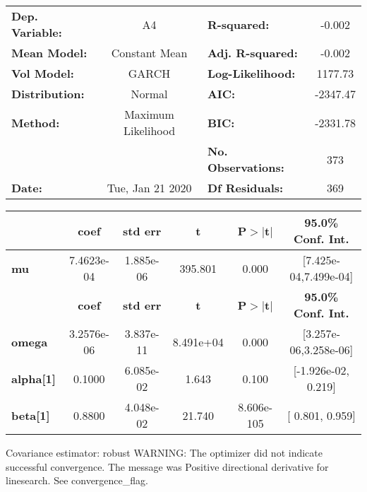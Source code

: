 \begin{center}
\begin{tabular}{lclc}
\toprule
\textbf{Dep. Variable:} &         A4         & \textbf{  R-squared:         } &    -0.002   \\
\textbf{Mean Model:}    &   Constant Mean    & \textbf{  Adj. R-squared:    } &    -0.002   \\
\textbf{Vol Model:}     &       GARCH        & \textbf{  Log-Likelihood:    } &    1177.73  \\
\textbf{Distribution:}  &       Normal       & \textbf{  AIC:               } &   -2347.47  \\
\textbf{Method:}        & Maximum Likelihood & \textbf{  BIC:               } &   -2331.78  \\
\textbf{}               &                    & \textbf{  No. Observations:  } &    373      \\
\textbf{Date:}          &  Tue, Jan 21 2020  & \textbf{  Df Residuals:      } &    369      \\
\bottomrule
\end{tabular}
\begin{tabular}{lccccc}
            & \textbf{coef} & \textbf{std err} & \textbf{t} & \textbf{P$>$$|$t$|$} & \textbf{95.0\% Conf. Int.}  \\
\midrule
\textbf{mu} &   7.4623e-04  &    1.885e-06     &   395.801  &        0.000         &   [7.425e-04,7.499e-04]     \\
                  & \textbf{coef} & \textbf{std err} & \textbf{t} & \textbf{P$>$$|$t$|$} & \textbf{95.0\% Conf. Int.}  \\
\midrule
\textbf{omega}    &   3.2576e-06  &    3.837e-11     & 8.491e+04  &        0.000         &   [3.257e-06,3.258e-06]     \\
\textbf{alpha[1]} &       0.1000  &    6.085e-02     &     1.643  &          0.100       &    [-1.926e-02,  0.219]     \\
\textbf{beta[1]}  &       0.8800  &    4.048e-02     &    21.740  &      8.606e-105      &     [  0.801,  0.959]       \\
\bottomrule
\end{tabular}
\end{center}

Covariance estimator: robust \newline
  \newline
 WARNING: The optimizer did not indicate successful convergence. The message was \newline
 Positive directional derivative for linesearch. See convergence_flag.